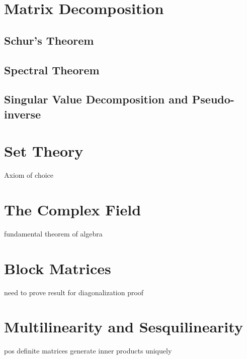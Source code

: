 \documentclass[oneside, 12pt]{book}
\theoremstyle{definition}
\begin{document}
\chapter{Matrix Decomposition}
\section{Schur's Theorem}
\section{Spectral Theorem}
\section{Singular Value Decomposition and Pseudo-inverse}
\appendix
\chapter{Set Theory}
Axiom of choice
\chapter{The Complex Field}
fundamental theorem of algebra
\chapter{Block Matrices}
need to prove result for diagonalization proof
\chapter{Multilinearity and Sesquilinearity}
pos definite matrices generate inner products uniquely
\cleardoublepage
{}
{}
\printbibliography[title={References}]
\end{document}
